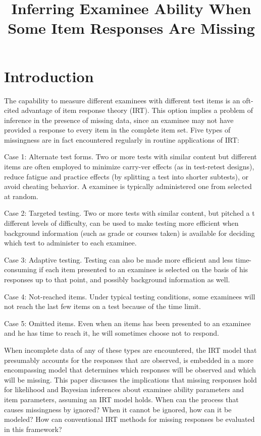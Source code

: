 \documentclass[
    a4paper,                %
    11pt,                   %
    jou,                    %
    biblatex                %
    colorlinks=true,        %
    linkcolor=red,          %
    anchorcolor=black,      %
    citecolor=blue,         %
    urlcolor=blue,          %
    bookmarks=true,         %
    bookmarksopen=false,    %
    bookmarksnumbered=true  %
]{apa7}
\title{Inferring Examinee Ability When Some Item Responses Are Missing}
\begin{document}
\maketitle

\section{Introduction}

The capability to measure different examinees with different test items is an oft-cited advantage of item response theory (IRT). This option implies a problem of inference in the presence of missing data, since an examinee may not have provided a response to every item in the complete item set. Five types of missingness are in fact encountered regularly in routine applications of IRT:

Case 1: Alternate test forms. Two or more tests with similar content but different items are often employed to minimize carry-ver effects (as in test-retest designs), reduce fatigue and practice effects (by splitting a test into shorter subtests), or avoid cheating behavior. A examinee is typically administered one from selected at random.

Case 2: Targeted testing. Two or more tests with similar content, but pitched a t different levels of difficulty, can be used to make testing more efficient when background information (such as grade or courses taken) is available for deciding which test to administer to each examinee.

Case 3: Adaptive testing. Testing can also be made more efficient and less time-consuming if each item presented to an examinee is selected on the basis of his responses up to that point, and possibly background information as well.

Case 4: Not-reached items. Under typical testing conditions, some examinees will not reach the last few items on a test because of the time limit.

Case 5:  Omitted items. Even when an items has been presented to an examinee and he has time to reach it, he will sometimes choose not to respond.

When incomplete data of any of these types are encountered, the IRT model that presumably accounts for the responses that are observed, is embedded in a more encompassing model that determines which responses will be observed and which will be missing. This paper discusses the implications that missing responses hold for likelihood and Bayesian inferences about examinee ability parameters and item parameters, assuming an IRT model holds. When can the process that causes missingness by ignored? When it cannot be ignored, how can it be modeled? How can conventional IRT methods for missing responses be evaluated in this framework?
\end{document}
